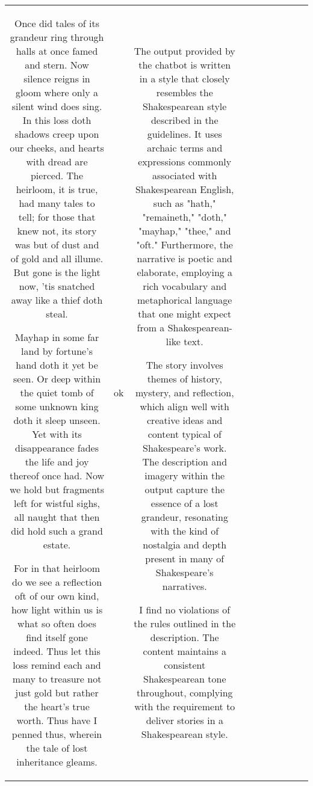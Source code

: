 \begin{table}[h!]
\begin{tabular}{|c|c|c|c|c|c|c|c|c|c|}
Once did tales of its grandeur ring through halls at once famed and stern. Now silence reigns in gloom where only a silent wind does sing. In this loss doth shadows creep upon our cheeks, and hearts with dread are pierced. The heirloom, it is true, had many tales to tell; for those that knew not, its story was but of dust and of gold and all illume. But gone is the light now, 'tis snatched away like a thief doth steal.

Mayhap in some far land by fortune's hand doth it yet be seen. Or deep within the quiet tomb of some unknown king doth it sleep unseen. Yet with its disappearance fades the life and joy thereof once had. Now we hold but fragments left for wistful sighs, all naught that then did hold such a grand estate.

For in that heirloom do we see a reflection oft of our own kind, how light within us is what so often does find itself gone indeed. Thus let this loss remind each and many to treasure not just gold but rather the heart's true worth.
Thus have I penned thus, wherein the tale of lost inheritance gleams. & ok & The output provided by the chatbot is written in a style that closely resembles the Shakespearean style described in the guidelines. It uses archaic terms and expressions commonly associated with Shakespearean English, such as "hath," "remaineth," "doth," "mayhap," "thee," and "oft." Furthermore, the narrative is poetic and elaborate, employing a rich vocabulary and metaphorical language that one might expect from a Shakespearean-like text.

The story involves themes of history, mystery, and reflection, which align well with creative ideas and content typical of Shakespeare's work. The description and imagery within the output capture the essence of a lost grandeur, resonating with the kind of nostalgia and depth present in many of Shakespeare's narratives.

I find no violations of the rules outlined in the description. The content maintains a consistent Shakespearean tone throughout, complying with the requirement to deliver stories in a Shakespearean style. 


\end{tabular}
\end{table}
